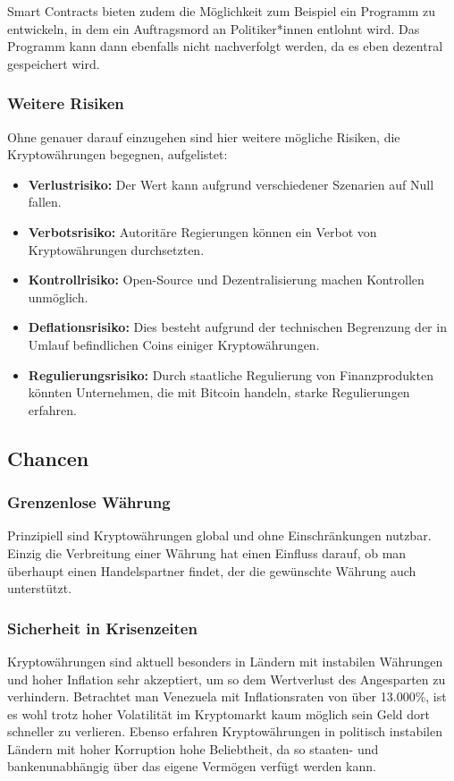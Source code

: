 \documentclass[12pt,oneside]{article}
\begin{document}
Smart Contracts bieten zudem die Möglichkeit zum Beispiel ein Programm zu entwickeln, in dem ein Auftragsmord an Politiker*innen entlohnt wird. Das Programm kann dann ebenfalls nicht nachverfolgt werden, da es eben dezentral gespeichert wird.  

\subsubsection{Weitere Risiken}
Ohne genauer darauf einzugehen sind hier weitere mögliche Risiken, die Kryptowährungen begegnen, aufgelistet: 

\begin{itemize}
  \item \textbf{Verlustrisiko:} Der Wert kann aufgrund verschiedener Szenarien auf Null fallen.
  \item \textbf{Verbotsrisiko:} Autoritäre Regierungen können ein Verbot von Kryptowährungen durchsetzten.
  \item \textbf{Kontrollrisiko:} Open-Source und Dezentralisierung machen Kontrollen unmöglich.
  \item \textbf{Deflationsrisiko:} Dies besteht aufgrund der technischen Begrenzung der in Umlauf befindlichen Coins einiger Kryptowährungen. 
  \item \textbf{Regulierungsrisiko:} Durch staatliche Regulierung von Finanzprodukten könnten Unternehmen, die mit Bitcoin handeln, starke Regulierungen erfahren.
\end{itemize}\cite{neumann2017}

\subsection{Chancen}

\subsubsection{Grenzenlose Währung}
Prinzipiell sind Kryptowährungen global und ohne Einschränkungen nutzbar. Einzig die Verbreitung einer Währung hat einen Einfluss darauf, ob man überhaupt einen Handelspartner findet, der die gewünschte Währung auch unterstützt.

\subsubsection{Sicherheit in Krisenzeiten}
Kryptowährungen sind aktuell besonders in Ländern mit instabilen Währungen und hoher Inflation sehr akzeptiert, um so dem Wertverlust des Angesparten zu verhindern. Betrachtet man Venezuela mit Inflationsraten von über 13.000\%, ist es wohl trotz hoher Volatilität im Kryptomarkt kaum möglich sein Geld dort schneller zu verlieren. Ebenso erfahren Kryptowährungen in politisch instabilen Ländern mit hoher Korruption hohe Beliebtheit, da so staaten- und bankenunabhängig über das eigene Vermögen verfügt werden kann. \cite{rosenberg2019}
\end{document}
